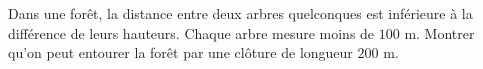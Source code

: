 Dans une forêt, la distance entre deux arbres quelconques est inférieure à la différence de leurs hauteurs. Chaque arbre mesure moins de $100$ m. Montrer qu'on peut entourer la forêt par une clôture de longueur $200$ m.
